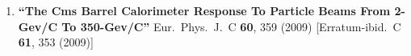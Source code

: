 \documentclass[10pt]{letter}
\begin{document}
\begin{enumerate}



\item%
{\bf ``The Cms Barrel Calorimeter Response To Particle Beams From 2-Gev/C To 350-Gev/C''}
  {}Eur.\ Phys.\ J.\  C {\bf 60}, 359 (2009)
  [Erratum-ibid.\  C {\bf 61}, 353 (2009)]


\end{enumerate}
\end{document}
